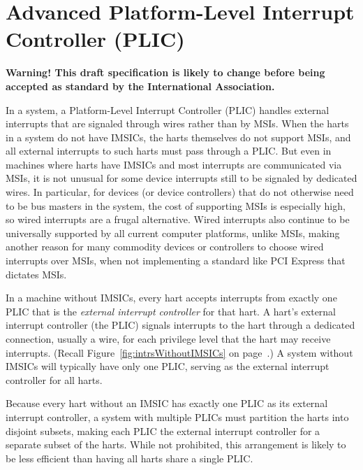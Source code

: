 
\chapter{Advanced Platform-Level Interrupt Controller (PLIC)}
\label{ch:AdvPLIC}

\textbf{%
Warning!
This draft specification is likely to change before being accepted as
standard by the {\RISCV} International Association.%
}
\bigskip

In a {\RISCV} system, a Platform-Level Interrupt Controller (PLIC)
handles external interrupts that are signaled through wires rather than
by MSIs.
When the {\RISCV} harts in a system do not have IMSICs, the harts
themselves do not support MSIs, and all external interrupts to such
harts must pass through a PLIC.
But even in machines where harts have IMSICs and most interrupts are
communicated via MSIs, it is not unusual for some device interrupts
still to be signaled by dedicated wires.
In particular, for devices (or device controllers) that do not
otherwise need to be bus masters in the system, the cost of supporting
MSIs is especially high, so wired interrupts are a frugal alternative.
Wired interrupts also continue to be universally supported by all
current computer platforms, unlike MSIs, making another reason for many
commodity devices or controllers to choose wired interrupts over MSIs,
when not implementing a standard like PCI Express that dictates MSIs.

In a machine without IMSICs, every {\RISCV} hart accepts interrupts
from exactly one PLIC that is the \emph{external interrupt controller}
for that hart.
A hart's external interrupt controller (the PLIC) signals interrupts
to the hart through a dedicated connection, usually a wire, for each
privilege level that the hart may receive interrupts.
(Recall Figure~\ref{fig:intrsWithoutIMSICs} on
page~\pageref{fig:intrsWithoutIMSICs}.)
A system without IMSICs will typically have only one PLIC, serving as
the external interrupt controller for all {\RISCV} harts.

\begin{commentary}
Because every {\RISCV} hart without an IMSIC has exactly one PLIC
as its external interrupt controller, a system with multiple PLICs
must partition the harts into disjoint subsets, making each PLIC the
external interrupt controller for a separate subset of the harts.
While not prohibited, this arrangement is likely to be less efficient
than having all harts share a single PLIC.
\end{commentary}

